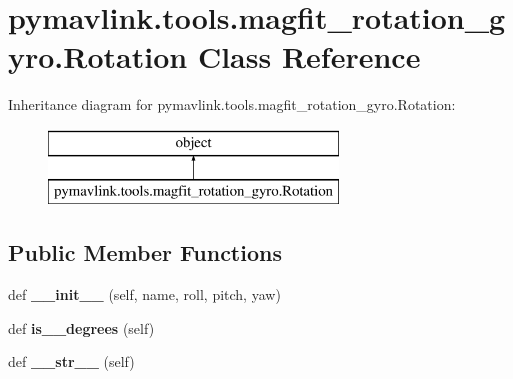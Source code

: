 \hypertarget{classpymavlink_1_1tools_1_1magfit__rotation__gyro_1_1Rotation}{}\section{pymavlink.\+tools.\+magfit\+\_\+rotation\+\_\+gyro.\+Rotation Class Reference}
\label{classpymavlink_1_1tools_1_1magfit__rotation__gyro_1_1Rotation}
Inheritance diagram for pymavlink.\+tools.\+magfit\+\_\+rotation\+\_\+gyro.\+Rotation\+:\begin{figure}[H]
\begin{center}
\leavevmode
\includegraphics[height=2.000000cm]{classpymavlink_1_1tools_1_1magfit__rotation__gyro_1_1Rotation}
\end{center}
\end{figure}
\subsection*{Public Member Functions}
\begin{DoxyCompactItemize}
\item 
\mbox{\label{classpymavlink_1_1tools_1_1magfit__rotation__gyro_1_1Rotation_accac6f6ca7fb0d96a8e61d64e4e180a7}} 
def {\bfseries \+\_\+\+\_\+init\+\_\+\+\_\+} (self, name, roll, pitch, yaw)
\item 
\mbox{\label{classpymavlink_1_1tools_1_1magfit__rotation__gyro_1_1Rotation_a388b13ac359df1c516f995babbc28f0d}} 
def {\bfseries is\+\_\+\_\+degrees} (self)
\item 
\mbox{\label{classpymavlink_1_1tools_1_1magfit__rotation__gyro_1_1Rotation_af3301ae970af4c603fd959eeefc9e53d}} 
def {\bfseries \+\_\+\+\_\+str\+\_\+\+\_\+} (self)
\end{DoxyCompactItemize}
